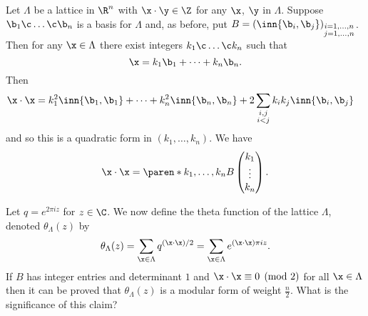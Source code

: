 Let $\Lambda$ be a lattice in $\R^n$ with $\x\cdot\y\in\Z$ for any $\x$, $\y$ in $\Lambda$.  Suppose $\b_1\c \dotsc\c \b_n$ is a basis for $\Lambda$ and, as before, put $B=(\inn{\b_i,\b_j})_{\substack{i=1,\dotsc,n\\j=1,\dotsc,n}}$.  Then for any $\x\in\Lambda$ there exist integers $k_1\c \dotsc\c k_n$ such that
\[ \x = k_1\b_1 + \dotsb + k_n\b_n . \]
Then
\begin{align*}
\x\cdot\x &= k_1^2\inn{\b_1,\b_1} + \dotsb + k_n^2 \inn{\b_n,\b_n} %
+ 2 \sum_{\substack{i,j\\i<j}} k_ik_j \inn{\b_i,\b_j}
\end{align*}
and so this is a quadratic form in $(k_1,\dotsc,k_n)$.  We have
\[ \x\cdot\x = \paren*{k_1,\dotsc,k_n} B \begin{pmatrix}k_1\\\vdots\\k_n\end{pmatrix} . \]

Let $q=e^{2\pi i z}$ for $z\in\C$.  We now define the theta function of the lattice $\Lambda$, denoted $\theta_\Lambda(z)$ by
\[ \theta_\Lambda(z) = \sum_{\x\in\Lambda} q^{(\x\cdot\x)/2} = \sum_{\x\in\Lambda} e^{(\x\cdot\x)\pi iz} . \]
If $B$ has integer entries and determinant $1$ and $\x\cdot\x\equiv0\pmod2$ for all $\x\in\Lambda$ then it can be proved that $\theta_\Lambda(z)$ is a modular form of weight $\frac n2$.  What is the significance of this claim?
